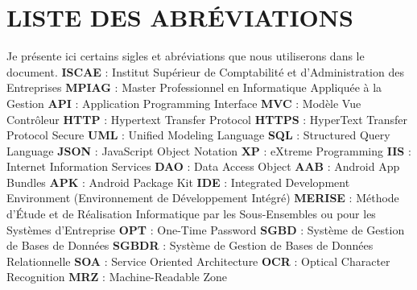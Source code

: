 \documentclass[a4paper, 12pt]{report}
\begin{document}
	\chapter*{LISTE DES ABRÉVIATIONS} \label{chap:1SIGLES ET ABREVIATIONS}
	Je présente ici certains sigles et abréviations que nous utiliserons dans le document.
	\newline\newline
	\textbf{ISCAE} : Institut Supérieur de Comptabilité et d’Administration des Entreprises \newline
	\textbf{MPIAG} : Master Professionnel en Informatique Appliquée à la Gestion \newline
	\textbf{API} : Application Programming Interface \newline
	\textbf{MVC} : Modèle Vue Contrôleur \newline
	\textbf{HTTP} : Hypertext Transfer Protocol \newline
	\textbf{HTTPS} : HyperText Transfer Protocol Secure \newline
	\textbf{UML} : Unified Modeling Language \newline
	\textbf{SQL} : Structured Query Language \newline
	\textbf{JSON} : JavaScript Object Notation \newline
	\textbf{XP} : eXtreme Programming \newline
	\textbf{IIS} : Internet Information Services \newline
	\textbf{DAO} : Data Access Object \newline
	\textbf{AAB} : Android App Bundles \newline
	\textbf{APK} : Android Package Kit \newline
	\textbf{IDE} : Integrated Development Environment (Environnement de Développement Intégré) \newline
	\textbf{MERISE} : Méthode d’Étude et de Réalisation Informatique par les Sous-Ensembles ou pour les Systèmes d’Entreprise \newline
	\textbf{OPT} : One-Time Password \newline
	\textbf{SGBD} : Système de Gestion de Bases de Données \newline
	\textbf{SGBDR} : Système de Gestion de Bases de Données Relationnelle \newline
	\textbf{SOA} : Service Oriented Architecture \newline
	\textbf{OCR} : Optical Character Recognition  \newline
	\textbf{MRZ} : Machine-Readable Zone  
	\thispagestyle{empty}
	
	\tableofcontents
	\thispagestyle{empty}
	
	
	
	
	
\end{document}
